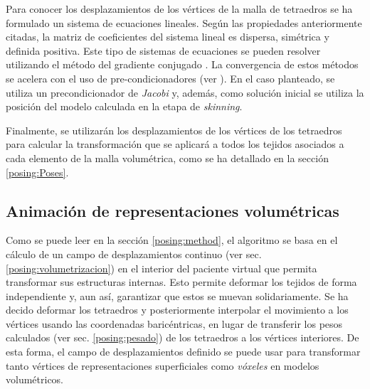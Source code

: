 Para conocer los desplazamientos de los vértices de la malla de tetraedros se ha formulado un sistema de ecuaciones lineales. Según las propiedades anteriormente citadas, la matriz de coeficientes del sistema lineal es dispersa, simétrica y definida positiva. Este tipo de sistemas de ecuaciones se pueden resolver utilizando el método del gradiente conjugado \cite{Press2007}. La convergencia de estos métodos se acelera con el uso de pre-condicionadores (ver \cite{hauth2003}). En el caso planteado, se utiliza un precondicionador de \emph{Jacobi} y, además, como solución inicial se utiliza la posición del modelo calculada en la etapa de \emph{skinning}. %

Finalmente, se utilizarán los desplazamientos de los vértices de los tetraedros para calcular la transformación que se aplicará a todos los tejidos asociados a cada elemento de la malla volumétrica, como se ha detallado en la sección \ref{posing:Poses}.%

\subsection{Animación de representaciones volumétricas}
\label{posing:animvol}



Como se puede leer en la sección 
\ref{posing:method}, el algoritmo se basa en el cálculo de un campo de desplazamientos continuo (ver sec. \ref{posing:volumetrizacion}) %
en el interior del paciente virtual que permita transformar sus estructuras internas. Esto permite deformar los tejidos de forma independiente y, aun así, garantizar que estos se muevan solidariamente. Se ha decido deformar los tetraedros y posteriormente interpolar el movimiento a los vértices usando las coordenadas baricéntricas, en lugar de transferir los pesos calculados (ver sec. \ref{posing:pesado}) de los tetraedros a los vértices interiores. 
De esta forma, el campo de desplazamientos definido se puede usar para transformar tanto vértices de representaciones superficiales como \emph{vóxeles} en modelos volumétricos. 


